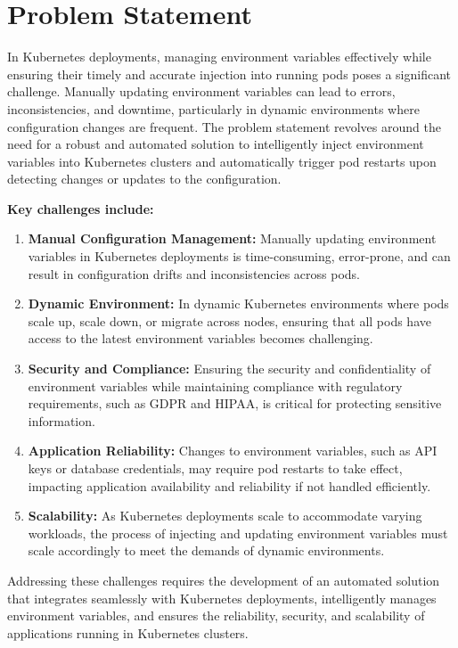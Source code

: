 \section{Problem Statement}

In Kubernetes deployments, managing environment variables effectively while ensuring their timely and accurate injection into running pods poses a significant challenge. Manually updating environment variables can lead to errors, inconsistencies, and downtime, particularly in dynamic environments where configuration changes are frequent. The problem statement revolves around the need for a robust and automated solution to intelligently inject environment variables into Kubernetes clusters and automatically trigger pod restarts upon detecting changes or updates to the configuration.

\bigskip

\textbf{Key challenges include:}

\begin{enumerate}
    \item \textbf{Manual Configuration Management:} Manually updating environment variables in Kubernetes deployments is time-consuming, error-prone, and can result in configuration drifts and inconsistencies across pods.
    
    \item \textbf{Dynamic Environment:} In dynamic Kubernetes environments where pods scale up, scale down, or migrate across nodes, ensuring that all pods have access to the latest environment variables becomes challenging.
    
    \item \textbf{Security and Compliance:} Ensuring the security and confidentiality of environment variables while maintaining compliance with regulatory requirements, such as GDPR and HIPAA, is critical for protecting sensitive information.
    
    \item \textbf{Application Reliability:} Changes to environment variables, such as API keys or database credentials, may require pod restarts to take effect, impacting application availability and reliability if not handled efficiently.
    
    \item \textbf{Scalability:} As Kubernetes deployments scale to accommodate varying workloads, the process of injecting and updating environment variables must scale accordingly to meet the demands of dynamic environments.
\end{enumerate}

Addressing these challenges requires the development of an automated solution that integrates seamlessly with Kubernetes deployments, intelligently manages environment variables, and ensures the reliability, security, and scalability of applications running in Kubernetes clusters.
